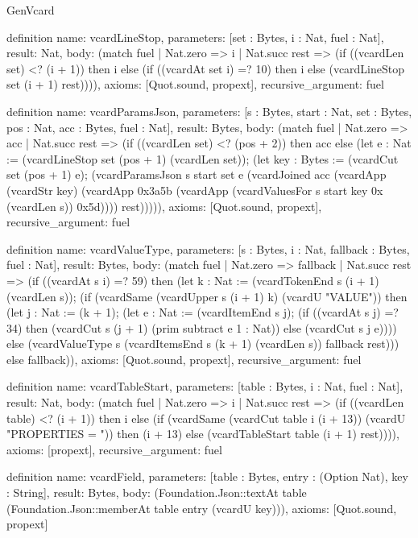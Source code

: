 \begin{lexlean}{GenVcard}
\begin{semanticmodule}
definition{
  name: vcardLineStop,
  parameters: [set : Bytes, i : Nat, fuel : Nat],
  result: Nat,
  body: (match fuel
    | Nat.zero => i
    | Nat.succ rest => (if ((vcardLen set) <? (i + 1)) then i else (if ((vcardAt set i) =? 10) then i else (vcardLineStop set (i + 1) rest)))),
  axioms: [Quot.sound, propext],
  recursive_argument: fuel
}

definition{
  name: vcardParamsJson,
  parameters: [s : Bytes, start : Nat, set : Bytes, pos : Nat, acc : Bytes, fuel : Nat],
  result: Bytes,
  body: (match fuel
    | Nat.zero => acc
    | Nat.succ rest => (if ((vcardLen set) <? (pos + 2)) then acc else (let e : Nat := (vcardLineStop set (pos + 1) (vcardLen set)); (let key : Bytes := (vcardCut set (pos + 1) e); (vcardParamsJson s start set e (vcardJoined acc (vcardApp (vcardStr key) (vcardApp 0x3a5b (vcardApp (vcardValuesFor s start key 0x (vcardLen s)) 0x5d)))) rest))))),
  axioms: [Quot.sound, propext],
  recursive_argument: fuel
}

definition{
  name: vcardValueType,
  parameters: [s : Bytes, i : Nat, fallback : Bytes, fuel : Nat],
  result: Bytes,
  body: (match fuel
    | Nat.zero => fallback
    | Nat.succ rest => (if ((vcardAt s i) =? 59) then (let k : Nat := (vcardTokenEnd s (i + 1) (vcardLen s)); (if (vcardSame (vcardUpper s (i + 1) k) (vcardU "VALUE")) then (let j : Nat := (k + 1); (let e : Nat := (vcardItemEnd s j); (if ((vcardAt s j) =? 34) then (vcardCut s (j + 1) (prim subtract e 1 : Nat)) else (vcardCut s j e)))) else (vcardValueType s (vcardItemsEnd s (k + 1) (vcardLen s)) fallback rest))) else fallback)),
  axioms: [Quot.sound, propext],
  recursive_argument: fuel
}

definition{
  name: vcardTableStart,
  parameters: [table : Bytes, i : Nat, fuel : Nat],
  result: Nat,
  body: (match fuel
    | Nat.zero => i
    | Nat.succ rest => (if ((vcardLen table) <? (i + 1)) then i else (if (vcardSame (vcardCut table i (i + 13)) (vcardU "PROPERTIES = ")) then (i + 13) else (vcardTableStart table (i + 1) rest)))),
  axioms: [propext],
  recursive_argument: fuel
}

definition{
  name: vcardField,
  parameters: [table : Bytes, entry : (Option Nat), key : String],
  result: Bytes,
  body: (Foundation.Json::textAt table (Foundation.Json::memberAt table entry (vcardU key))),
  axioms: [Quot.sound, propext]
}


\end{semanticmodule}
\end{lexlean}
